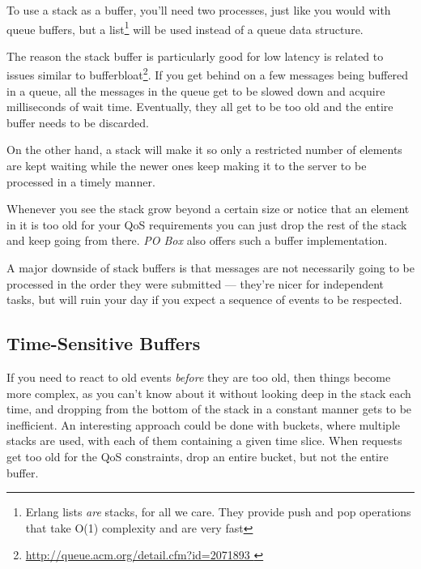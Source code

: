 \documentclass[11pt, oneside]{book}   	%
\begin{document}
To use a stack as a buffer, you'll need two processes, just like you would with queue buffers, but a list\footnote{Erlang lists \emph{are} stacks, for all we care. They provide push and pop operations that take O(1) complexity and are very fast} will be used instead of a queue data structure.

The reason the stack buffer is particularly good for low latency is related to issues similar to bufferbloat\footnote{\href{http://queue.acm.org/detail.cfm?id=2071893}{http://queue.acm.org/detail.cfm?id=2071893 }}. If you get behind on a few messages being buffered in a queue, all the messages in the queue get to be slowed down and acquire milliseconds of wait time. Eventually, they all get to be too old and the entire buffer needs to be discarded.


On the other hand, a stack will make it so only a restricted number of elements are kept waiting while the newer ones keep making it to the server to be processed in a timely manner.


Whenever you see the stack grow beyond a certain size or notice that an element in it is too old for your QoS requirements you can just drop the rest of the stack and keep going from there. \emph{PO Box} also offers such a buffer implementation.

A major downside of stack buffers is that messages are not necessarily going to be processed in the order they were submitted — they're nicer for independent tasks, but will ruin your day if you expect a sequence of events to be respected.

\subsection{Time-Sensitive Buffers}

If you need to react to old events \emph{before} they are too old, then things become more complex, as you can't know about it without looking deep in the stack each time, and dropping from the bottom of the stack in a constant manner gets to be inefficient. An interesting approach could be done with buckets, where multiple stacks are used, with each of them containing a given time slice. When requests get too old for the QoS constraints, drop an entire bucket, but not the entire buffer.
\end{document}
